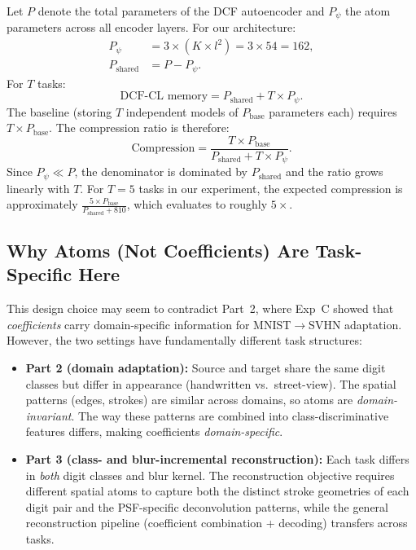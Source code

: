 \documentclass[11pt,letterpaper]{article}
\begin{document}
Let $P$ denote the total parameters of the DCF autoencoder and $P_\psi$ the
atom parameters across all encoder layers.  For our architecture:
\begin{align}
  P_\psi &= 3 \times (K \times l^2) = 3 \times 54 = 162, \\
  P_\text{shared} &= P - P_\psi.
\end{align}
For $T$ tasks:
\begin{equation}
  \text{DCF-CL memory} = P_\text{shared} + T \times P_\psi.
\end{equation}
The baseline (storing $T$ independent models of $P_\text{base}$ parameters
each) requires $T \times P_\text{base}$.  The compression ratio is therefore:
\begin{equation}
  \text{Compression} = \frac{T \times P_\text{base}}{P_\text{shared} + T \times P_\psi}.
  \label{eq:compression}
\end{equation}
Since $P_\psi \ll P$, the denominator is dominated by $P_\text{shared}$ and
the ratio grows linearly with $T$.  For $T = 5$ tasks in our experiment, the
expected compression is approximately
$\frac{5 \times P_\text{base}}{P_\text{shared} + 810}$, which evaluates to
roughly $5\times$.

\subsection{Why Atoms (Not Coefficients) Are Task-Specific Here}

This design choice may seem to contradict Part~2, where Exp~C showed that
\emph{coefficients} carry domain-specific information for MNIST$\to$SVHN
adaptation.  However, the two settings have fundamentally different task
structures:

\begin{itemize}[leftmargin=*]
  \item \textbf{Part 2 (domain adaptation):} Source and target share the same
    digit classes but differ in appearance (handwritten vs.\ street-view).
    The spatial patterns (edges, strokes) are similar across domains, so atoms
    are \emph{domain-invariant}.  The way these patterns are combined into
    class-discriminative features differs, making coefficients
    \emph{domain-specific}.

  \item \textbf{Part 3 (class- and blur-incremental reconstruction):} Each
    task differs in \emph{both} digit classes and blur kernel.  The
    reconstruction objective requires different spatial atoms to capture both
    the distinct stroke geometries of each digit pair and the PSF-specific
    deconvolution patterns, while the general reconstruction pipeline
    (coefficient combination + decoding) transfers across tasks.
\end{itemize}
\end{document}
